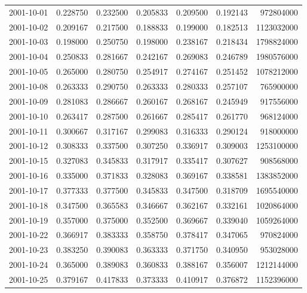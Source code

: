 \begin{tabular}{lrrrrrr}
2001-10-01 &    0.228750 &    0.232500 &    0.205833 &    0.209500 &    0.192143 &   972804000 \\
2001-10-02 &    0.209167 &    0.217500 &    0.188833 &    0.199000 &    0.182513 &  1123032000 \\
2001-10-03 &    0.198000 &    0.250750 &    0.198000 &    0.238167 &    0.218434 &  1798824000 \\
2001-10-04 &    0.250833 &    0.281667 &    0.242167 &    0.269083 &    0.246789 &  1980576000 \\
2001-10-05 &    0.265000 &    0.280750 &    0.254917 &    0.274167 &    0.251452 &  1078212000 \\
2001-10-08 &    0.263333 &    0.290750 &    0.263333 &    0.280333 &    0.257107 &   765900000 \\
2001-10-09 &    0.281083 &    0.286667 &    0.260167 &    0.268167 &    0.245949 &   917556000 \\
2001-10-10 &    0.263417 &    0.287500 &    0.261667 &    0.285417 &    0.261770 &   968124000 \\
2001-10-11 &    0.300667 &    0.317167 &    0.299083 &    0.316333 &    0.290124 &   918000000 \\
2001-10-12 &    0.308333 &    0.337500 &    0.307250 &    0.336917 &    0.309003 &  1253100000 \\
2001-10-15 &    0.327083 &    0.345833 &    0.317917 &    0.335417 &    0.307627 &   908568000 \\
2001-10-16 &    0.335000 &    0.371833 &    0.328083 &    0.369167 &    0.338581 &  1383852000 \\
2001-10-17 &    0.377333 &    0.377500 &    0.345833 &    0.347500 &    0.318709 &  1695540000 \\
2001-10-18 &    0.347500 &    0.365583 &    0.346667 &    0.362167 &    0.332161 &  1020864000 \\
2001-10-19 &    0.357000 &    0.375000 &    0.352500 &    0.369667 &    0.339040 &  1059264000 \\
2001-10-22 &    0.366917 &    0.383333 &    0.358750 &    0.378417 &    0.347065 &   970824000 \\
2001-10-23 &    0.383250 &    0.390083 &    0.363333 &    0.371750 &    0.340950 &   953028000 \\
2001-10-24 &    0.365000 &    0.389083 &    0.360833 &    0.388167 &    0.356007 &  1212144000 \\
2001-10-25 &    0.379167 &    0.417833 &    0.373333 &    0.410917 &    0.376872 &  1152396000 \\

\end{tabular}
